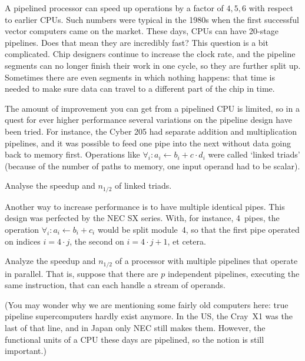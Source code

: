 A pipelined processor can speed up operations by a factor of $4,5,6$
with respect to earlier CPUs. Such numbers were typical in the 1980s
when the first successful vector computers came on the market. These
days, CPUs can have 20-stage pipelines. Does that mean they are
incredibly fast? This question is a bit complicated. Chip designers
continue to increase the clock rate, and the pipeline segments can no
longer finish their work in one cycle, so they are further split
up. Sometimes there are even segments in which nothing happens: that
time is needed to make sure data can travel to a different part of the
chip in time.


The amount of improvement you can get from a pipelined CPU is limited,
so in a quest for ever higher performance several variations on the
pipeline design have been tried. For instance, the Cyber 205 had
separate addition and multiplication pipelines, and it was possible to
feed one pipe into the next without data going back to memory
first. Operations like $\forall_i\colon a_i\leftarrow b_i+c\cdot d_i$
were called `linked triads' (because of the number of paths to memory,
one input operand had to be scalar).

\begin{exercise}
  Analyse the speedup and $n_{1/2}$ of linked triads.
\end{exercise}

Another way to increase performance is to have multiple identical
pipes. This design was perfected by the NEC SX series. With, for
instance, 4~pipes, the operation $\forall_i\colon a_i\leftarrow
b_i+c_i$ would be split module~4, so that the first pipe operated on
indices $i=4\cdot j$, the second on $i=4\cdot j+1$, et cetera.

\begin{exercise}
  Analyze the speedup and $n_{1/2}$ of a processor with multiple
  pipelines that operate in parallel. That is, suppose that there are
  $p$ independent pipelines, executing the same instruction, that can
  each handle a stream of operands.
\end{exercise}

(You may wonder why we are mentioning some fairly old computers here:
true pipeline supercomputers hardly exist anymore. In the US, the
Cray~X1 was the last of that line, and in Japan only NEC still makes
them. However, the functional units of a CPU these days are pipelined,
so the notion is still important.)

